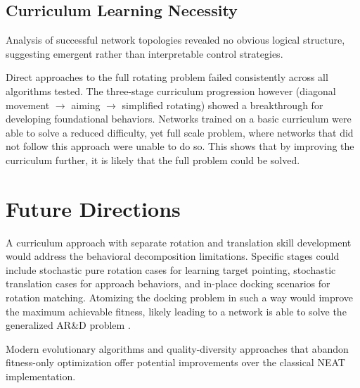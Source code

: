 \subsection{Curriculum Learning Necessity}

Analysis of successful network topologies revealed no obvious logical structure, suggesting emergent rather than interpretable control strategies. 

Direct approaches to the full rotating problem failed consistently across all algorithms tested. The three-stage curriculum progression however (diagonal movement $\rightarrow$ aiming $\rightarrow$ simplified rotating) showed a breakthrough for developing foundational behaviors. Networks trained on a basic curriculum were able to solve a reduced difficulty, yet full scale problem, where networks that did not follow this approach were unable to do so. This shows that by improving the curriculum further, it is likely that the full problem could be solved.

\section{Future Directions}
A curriculum approach with separate rotation and translation skill development would address the behavioral decomposition limitations. Specific stages could include stochastic pure rotation cases for learning target pointing, stochastic translation cases for approach behaviors, and in-place docking scenarios for rotation matching. Atomizing the docking problem in such a way would improve the maximum achievable fitness, likely leading to a network is able to solve the generalized AR\&D problem \parencite{elman1993learning}. 

Modern evolutionary algorithms and quality-diversity approaches that abandon fitness-only optimization \autocite{lehman2011abandoning} offer potential improvements over the classical NEAT implementation.




